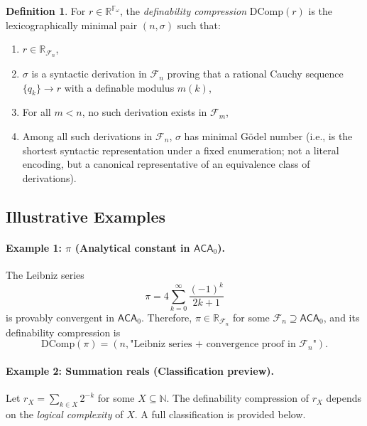 \documentclass[12pt]{article}
\theoremstyle{definition}
\newtheorem{definition}{Definition}[section]
\theoremstyle{plain}
\theoremstyle{remark}
\begin{document}
\begin{definition}
For \( r \in \mathbb{R}^{\mathbb{F}_\omega} \), the \emph{definability compression} \( \mathrm{DComp}(r) \) is the lexicographically minimal pair \( (n, \sigma) \) such that:
\begin{enumerate}
    \item \( r \in \mathbb{R}_{\mathcal{F}_n} \),
    \item \( \sigma \) is a syntactic derivation in \( \mathcal{F}_n \) proving that a rational Cauchy sequence \( \{ q_k \} \to r \) with a definable modulus \( m(k) \),
    \item For all \( m < n \), no such derivation exists in \( \mathcal{F}_m \),
    \item Among all such derivations in \( \mathcal{F}_n \), \( \sigma \) has minimal Gödel number (i.e., is the shortest syntactic representation under a fixed enumeration; not a literal encoding, but a canonical representative of an equivalence class of derivations).
\end{enumerate}
\end{definition}

\subsection*{Illustrative Examples}

\paragraph{Example 1: \( \pi \) (Analytical constant in \( \mathsf{ACA}_0 \)).}
The Leibniz series
\[
\pi = 4 \sum_{k=0}^{\infty} \frac{(-1)^k}{2k+1}
\]
is provably convergent in \( \mathsf{ACA}_0 \). Therefore, \( \pi \in \mathbb{R}_{\mathcal{F}_n} \) for some \( \mathcal{F}_n \supseteq \mathsf{ACA}_0 \), and its definability compression is
\[
\mathrm{DComp}(\pi) = \left(n, \text{"Leibniz series + convergence proof in } \mathcal{F}_n \text{"} \right).
\]

\paragraph{Example 2: Summation reals (Classification preview).}
Let \( r_X = \sum_{k \in X} 2^{-k} \) for some \( X \subseteq \mathbb{N} \). The definability compression of \( r_X \) depends on the \emph{logical complexity} of \( X \). A full classification is provided below.
\end{document}
